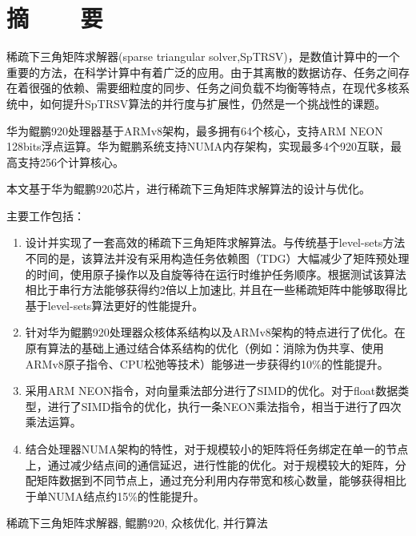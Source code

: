 \renewcommand{\baselinestretch}{1.5}
\fontsize{12pt}{13pt}\selectfont

\chapter[摘要]{摘~~~~要}

稀疏下三角矩阵求解器(sparse triangular solver,SpTRSV)，是数值计算中的一个重要的方法，在科学计算中有着广泛的应用。由于其离散的数据访存、任务之间存在着很强的依赖、需要细粒度的同步、任务之间负载不均衡等特点，在现代多核系统中，如何提升SpTRSV算法的并行度与扩展性，仍然是一个挑战性的课题。

华为鲲鹏920处理器基于ARMv8架构，最多拥有64个核心，支持ARM NEON 128bits浮点运算。华为鲲鹏系统支持NUMA内存架构，实现最多4个920互联，最高支持256个计算核心。

本文基于华为鲲鹏920芯片，进行稀疏下三角矩阵求解算法的设计与优化。

主要工作包括：%
\vspace{-10pt}
\begin{enumerate}
    \item 设计并实现了一套高效的稀疏下三角矩阵求解算法。与传统基于level-sets方法不同的是，该算法并没有采用构造任务依赖图（TDG）大幅减少了矩阵预处理的时间，使用原子操作以及自旋等待在运行时维护任务顺序。根据测试该算法相比于串行方法能够获得约2倍以上加速比, 并且在一些稀疏矩阵中能够取得比基于level-sets算法更好的性能提升。
    \item 针对华为鲲鹏920处理器众核体系结构以及ARMv8架构的特点进行了优化。在原有算法的基础上通过结合体系结构的优化（例如：消除为伪共享、使用ARMv8原子指令、CPU松弛等技术）能够进一步获得约10\%的性能提升。
    \item 采用ARM NEON指令，对向量乘法部分进行了SIMD的优化。对于float数据类型，进行了SIMD指令的优化，执行一条NEON乘法指令，相当于进行了四次乘法运算。
    \item 结合处理器NUMA架构的特性，对于规模较小的矩阵将任务绑定在单一的节点上，通过减少结点间的通信延迟，进行性能的优化。对于规模较大的矩阵，分配矩阵数据到不同节点上，通过充分利用内存带宽和核心数量，能够获得相比于单NUMA结点约15\%的性能提升。
\end{enumerate}
\vspace{-10pt}

\vspace{1em}
 \quad 稀疏下三角矩阵求解器, 鲲鹏920, 众核优化, 并行算法

\clearpage
\endinput
